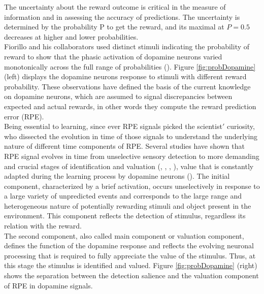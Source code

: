 The uncertainty about the reward outcome is critical in the measure of information and in assessing the accuracy of predictions. The uncertainty is determined by the probability P to get the reward, and its maximal at $P=0.5$ decreases at higher and lower probabilities.\\Fiorillo and his collaborators used distinct stimuli indicating the probability of reward to show that the phasic activation of dopamine neurons varied monotonically across the full range of probabilities (\cite{Fiorillo}). Figure \ref{fig:probDopamine} (left) displays the dopamine neurons response to stimuli with different reward probability. These observations have defined the basis of the current knowledge on dopamine neurons, which are assumed to signal discrepancies between expected and actual rewards, in other words they compute the reward prediction error (RPE).\\Being essential to learning, since ever RPE signals picked the scientist$'$ curiosity, who dissected the evolution in time of those signals to understand the underlying nature of different time components of RPE. Several studies have shown that RPE signal evolves in time from unselective sensory detection to more demanding and crucial stages of identification and valuation (\cite{Tobler2003}, \cite{Nomoto2010}, \cite{Fiorillo2013}, \cite{Schultz2016}), value that is constantly adapted during the learning process by dopamine neurons (\cite{Tobler2005}). The initial component, characterized by a brief activation, occurs unselectively in response to a large variety of unpredicted events and corresponds to the large range and heterogeneous nature of potentially rewarding stimuli and object present in the environment. This component reflects the detection of stimulus, regardless its relation with the reward.\\The second component, also called main component or valuation component, defines the function of the dopamine response and reflects the evolving neuronal processing that is required to fully appreciate the value of the stimulus. Thus, at this stage the stimulus is identified and valued. Figure \ref{fig:probDopamine} (right) shows the separation between the detection salience and the valuation component of RPE in dopamine  signals. %
